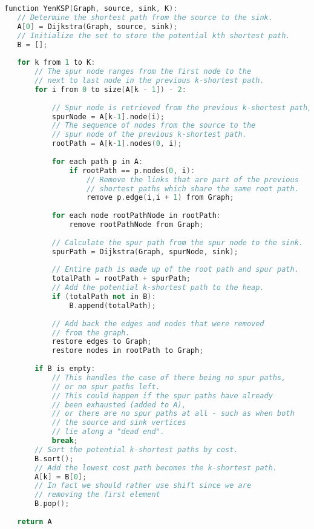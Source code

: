 \documentclass[a4paper,10pt,ngerman]{scrartcl}
\begin{document}
\begin{lstlisting}[language=C++]
function YenKSP(Graph, source, sink, K):
   // Determine the shortest path from the source to the sink.
   A[0] = Dijkstra(Graph, source, sink);
   // Initialize the set to store the potential kth shortest path.
   B = [];
   
   for k from 1 to K:
       // The spur node ranges from the first node to the 
       // next to last node in the previous k-shortest path.
       for i from 0 to size(A[k - 1]) - 2:
           
           // Spur node is retrieved from the previous k-shortest path, k - 1.
           spurNode = A[k-1].node(i);
           // The sequence of nodes from the source to the 
           // spur node of the previous k-shortest path.
           rootPath = A[k-1].nodes(0, i);
           
           for each path p in A:
               if rootPath == p.nodes(0, i):
                   // Remove the links that are part of the previous 
                   // shortest paths which share the same root path.
                   remove p.edge(i,i + 1) from Graph;
           
           for each node rootPathNode in rootPath:
               remove rootPathNode from Graph;
           
           // Calculate the spur path from the spur node to the sink.
           spurPath = Dijkstra(Graph, spurNode, sink);
           
           // Entire path is made up of the root path and spur path.
           totalPath = rootPath + spurPath;
           // Add the potential k-shortest path to the heap.
           if (totalPath not in B):
               B.append(totalPath);
           
           // Add back the edges and nodes that were removed
           // from the graph.
           restore edges to Graph;
           restore nodes in rootPath to Graph;
                   
       if B is empty:
           // This handles the case of there being no spur paths, 
           // or no spur paths left.
           // This could happen if the spur paths have already 
           // been exhausted (added to A), 
           // or there are no spur paths at all - such as when both 
           // the source and sink vertices 
           // lie along a "dead end".
           break;
       // Sort the potential k-shortest paths by cost.
       B.sort();
       // Add the lowest cost path becomes the k-shortest path.
       A[k] = B[0];
       // In fact we should rather use shift since we are 
       // removing the first element
       B.pop();
   
   return A
\end{lstlisting}\label{wikipedia.pseudo}
\end{document}
